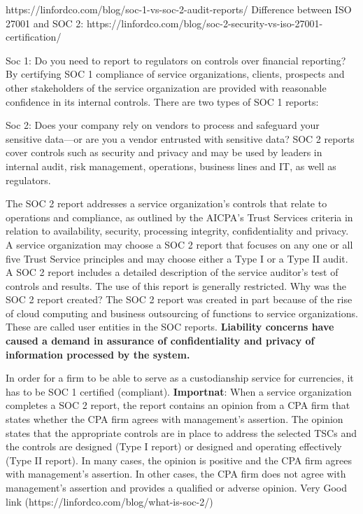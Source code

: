  https://linfordco.com/blog/soc-1-vs-soc-2-audit-reports/
Difference between ISO 27001 and SOC 2: https://linfordco.com/blog/soc-2-security-vs-iso-27001-certification/
\par
Soc 1: Do you need to report to regulators on controls over financial reporting? By certifying SOC 1 compliance of service organizations, clients, prospects and other stakeholders of the service organization are provided with reasonable confidence in its internal controls. 
There are two types of SOC 1 reports:


\par
Soc 2: Does your company rely on vendors to process and safeguard your sensitive data—or are you a vendor entrusted with sensitive data? SOC 2 reports cover controls such as security and privacy and may be used by leaders in internal audit, risk management, operations, business lines and IT, as well as regulators.

The SOC 2 report addresses a service organization’s controls that relate to operations and compliance, as outlined by the AICPA’s Trust Services criteria in relation to availability, security, processing integrity, confidentiality and privacy. A service organization may choose a SOC 2 report that focuses on any one or all five Trust Service principles and may choose either a Type I or a Type II audit. A SOC 2 report includes a detailed description of the service auditor’s test of controls and results. The use of this report is generally restricted.
Why was the SOC 2 report created?
The SOC 2 report was created in part because of the rise of cloud computing and business outsourcing of functions to service organizations. These are called user entities in the SOC reports. \textbf{Liability concerns have caused a demand in assurance of confidentiality and privacy of information processed by the system.}

\par
In order for a firm to be able to serve as a custodianship service for currencies, it has to be SOC 1 certified (compliant).
\textbf{Importnat}: When a service organization completes a SOC 2 report, the report contains an opinion from a CPA firm that states whether the CPA firm agrees with management’s assertion. The opinion states that the appropriate controls are in place to address the selected TSCs and the controls are designed (Type I report) or designed and operating effectively (Type II report). In many cases, the opinion is positive and the CPA firm agrees with management’s assertion. In other cases, the CPA firm does not agree with management’s assertion and provides a qualified or adverse opinion. Very Good link (https://linfordco.com/blog/what-is-soc-2/)

